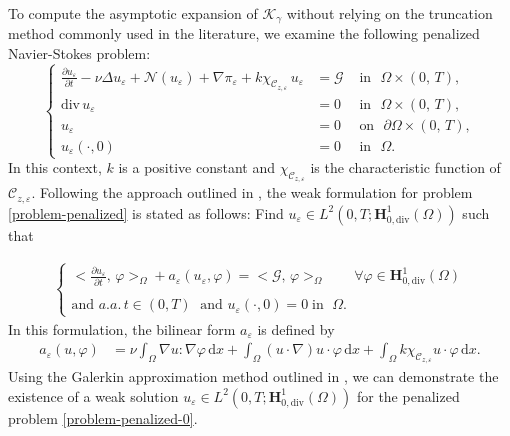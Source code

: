 \documentclass[a4paper,12pt,reqno,natbib]{amsart}
\newcommand{\dx} {\displaystyle\mathrm{d}x}
\def\K{\mathcal K}
\def\N{\mathcal N}
\def\H{\textbf{H}}
\begin{document}
To compute the asymptotic expansion of $\K_\gamma$ without relying on the truncation method commonly used in the literature, we examine the following penalized Navier-Stokes problem:
\begin{equation}\label{problem-penalized-0}
\left\{
\begin{array}{rll}
\displaystyle \frac {\partial u_\varepsilon}{\partial t}-\nu
\Delta u_\varepsilon+ \N(u_\varepsilon)+ \nabla \pi_\varepsilon
 +k\chi_{\mathcal{C}_{z,\varepsilon}}\, u_\varepsilon&= \mathcal{G} &\mbox{ in }  \,\,\Omega\times (0,\,T) ,\\
\mbox{div}\, u_\varepsilon &=  0 & \mbox{ in } \,\, \Omega \times (0,\,T) ,\\
u_\varepsilon &= 0 & \mbox{ on }\,\,  \partial\Omega \times (0,\,T) , \\
u_\varepsilon(\cdot,0)&= 0&\mbox{ in } \,\,  \Omega.
\end{array}
 \right.
\end{equation}
In this context, $k$ is a positive constant and $\chi_{\mathcal{C}_{z,\varepsilon}}$ is the characteristic function of $\mathcal{C}_{z,\varepsilon}.$ Following the approach outlined in \cite{TemamBook1977}, the weak formulation for problem \eqref{problem-penalized} is stated as follows: Find $u_\varepsilon\in  L^2(0,T; \H^1_{0,\text{div}}(\Omega))$ such that

\begin{align}\label{weak-f-penalized}
\left\{
  \begin{array}{ll}
    \displaystyle\big<\frac{\partial u_\varepsilon}{\partial t},\, \varphi\big>_\Omega+ a_\varepsilon(u_\varepsilon,\varphi)=\big<\mathcal{G},\, \varphi\big>_\Omega \qquad \forall \varphi\in \H^1_{0,\text{div}}(\Omega)  \\
    \\
    \text{and } a.a.\,t\in(0,T)\;\text{ and } u_\varepsilon(\cdot,0)=0\;\text{in } \;\Omega. 
  \end{array}
\right.
\end{align}
In this formulation, the bilinear form $a_\varepsilon$ is defined by
\begin{align}
    \label{bilinear}a_\varepsilon(u,\varphi)&=\nu\int_{\Omega}\nabla u :\nabla \varphi \,\dx+ \int_{\Omega} (u\cdot \nabla) u \cdot \varphi\, \dx+\int_{\Omega} k\chi_{\mathcal{C}_{z,\varepsilon}} u\cdot \varphi\, \dx.
\end{align}
Using the Galerkin approximation method outlined in \cite{TemamBook1977}, we can demonstrate the existence of a weak solution $u_\varepsilon \in L^2(0,T; \H^1_{0,\text{div}}(\Omega))$ for the penalized problem \eqref{problem-penalized-0}.
\end{document}
